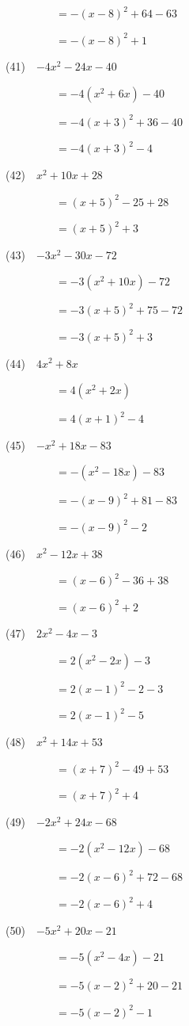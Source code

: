 \documentclass[a4j,twocolumn,10pt,fleqn]{jarticle}
\begin{document}
~~~~~~~~~$=-(x-8)^2 +64-63$

~~~~~~~~~$=-(x-8)^2 +1$

(41)~~$-4x^2-24x-40$

~~~~~~~~~$=-4(x^2 +6x)-40$

~~~~~~~~~$=-4(x +3)^2 +36-40$

~~~~~~~~~$=-4(x +3)^2-4$

(42)~~$x^2 +10x +28$

~~~~~~~~~$=(x +5)^2 -25+28$

~~~~~~~~~$=(x +5)^2 +3$

(43)~~$-3x^2-30x-72$

~~~~~~~~~$=-3(x^2 +10x)-72$

~~~~~~~~~$=-3(x +5)^2 +75-72$

~~~~~~~~~$=-3(x +5)^2 +3$

(44)~~$4x^2 +8x$

~~~~~~~~~$=4(x^2 +2x)$

~~~~~~~~~$=4(x +1)^2-4$

(45)~~$-x^2 +18x-83$

~~~~~~~~~$=-(x^2-18x)-83$

~~~~~~~~~$=-(x-9)^2 +81-83$

~~~~~~~~~$=-(x-9)^2-2$

(46)~~$x^2-12x +38$

~~~~~~~~~$=(x-6)^2 -36+38$

~~~~~~~~~$=(x-6)^2 +2$

(47)~~$2x^2-4x-3$

~~~~~~~~~$=2(x^2-2x)-3$

~~~~~~~~~$=2(x-1)^2-2-3$

~~~~~~~~~$=2(x-1)^2-5$

(48)~~$x^2 +14x +53$

~~~~~~~~~$=(x +7)^2 -49+53$

~~~~~~~~~$=(x +7)^2 +4$

(49)~~$-2x^2 +24x-68$

~~~~~~~~~$=-2(x^2-12x)-68$

~~~~~~~~~$=-2(x-6)^2 +72-68$

~~~~~~~~~$=-2(x-6)^2 +4$

(50)~~$-5x^2 +20x-21$

~~~~~~~~~$=-5(x^2-4x)-21$

~~~~~~~~~$=-5(x-2)^2 +20-21$

~~~~~~~~~$=-5(x-2)^2-1$
\end{document}
